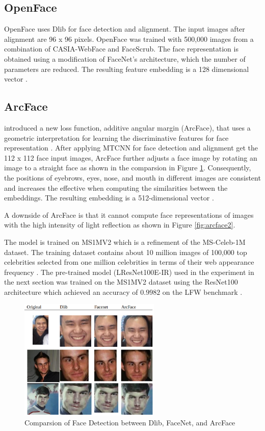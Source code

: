 \documentclass[12pt,english]{article}
\begin{document}
\subsection{OpenFace}
\quad
OpenFace uses Dlib for face detection and alignment. The input images after alignment are 96 x 96 pixels. OpenFace was trained with 500,000 images from a combination of CASIA-WebFace and FaceScrub. The face representation is obtained using a modification of FaceNet's architecture, which the number of parameters are reduced. The resulting feature embedding is a 128 dimensional vector \cite{amos}.

\subsection{ArcFace}
\quad
\cite{deng} introduced a new loss function, additive angular margin (ArcFace), that uses a geometric interpretation for learning the discriminative features for face representation \cite{deng}. After applying MTCNN for face detection and alignment \cite{deng2019} get the 112 x 112 face input images, ArcFace further adjusts a face image by rotating an image to a straight face as shown in the comparsion in Figure \ref{fig:arcface1}. Consequently, the positions of eyebrows, eyes, nose, and mouth in different images are consistent and increases the effective when computing the similarities between the embeddings. The resulting embedding is a 512-dimensional vector \cite{deng}.

A downside of ArcFace is that it cannot compute face representations of images with the high intensity of light reflection \cite{chinapas} as shown in Figure \ref{fig:arcface2}.

The model is trained on MS1MV2 which is a refinement of the MS-Celeb-1M dataset. The training dataset contains about 10 million images of 100,000 top celebrities selected from one million celebrities in terms of their web appearance frequency \cite{deng}. The pre-trained model (LResNet100E-IR) used in the experiment in the next section was trained on the MS1MV2 dataset using the ResNet100 architecture which achieved an accuracy of $0.9982$ on the LFW benchmark \cite{deng2019}.

\begin{figure}[!tbp]
 \centering
    \includegraphics[width=0.6\textwidth]{figures/comparison.png}
    \caption{Comparsion of Face Detection between Dlib, FaceNet, and ArcFace \cite{chinapas}}
	\label{fig:arcface1}
\end{figure}
\end{document}

